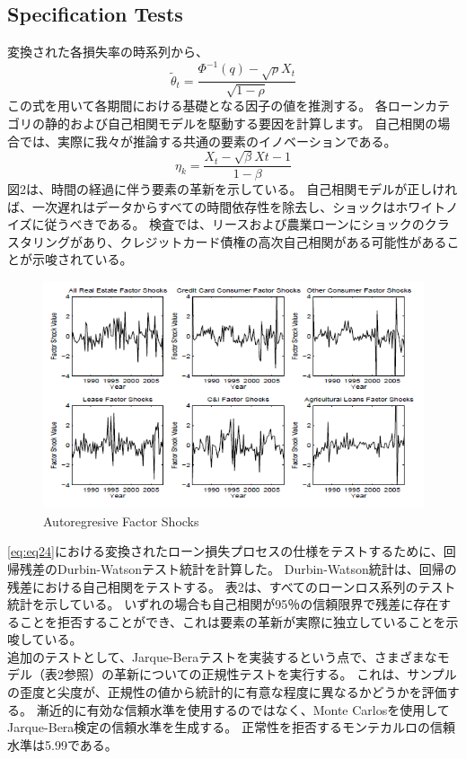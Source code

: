 \documentclass[a4j,12pt]{jarticle}
\begin{document}
\subsection{Specification Tests}
変換された各損失率の時系列から、
\begin{equation}
\tilde{\theta}_t=\frac{\Phi^{-1}(q)-\sqrt{\rho}X_t}{\sqrt{1-\rho}}
\end{equation}
この式を用いて各期間における基礎となる因子の値を推測する。 各ローンカテゴリの静的および自己相関モデルを駆動する要因を計算します。 自己相関の場合では、実際に我々が推論する共通の要素のイノベーションである。
\begin{equation}
\eta_k=\frac{X_t-\sqrt{\beta}X{t-1}}{1-\beta}
\end{equation}
図2は、時間の経過に伴う要素の革新を示している。 自己相関モデルが正しければ、一次遅れはデータからすべての時間依存性を除去し、ショックはホワイトノイズに従うべきである。 検査では、リースおよび農業ローンにショックのクラスタリングがあり、クレジットカード債権の高次自己相関がある可能性があることが示唆されている。
\begin{figure}[H]
\includegraphics{figure/ch2.png}
\caption{Autoregresive Factor Shocks}
\end{figure}
\eqref{eq:eq24}における変換されたローン損失プロセスの仕様をテストするために、回帰残差のDurbin-Watsonテスト統計を計算した。 Durbin-Watson統計は、回帰の残差における自己相関をテストする。 表2は、すべてのローンロス系列のテスト統計を示している。 いずれの場合も自己相関が95％の信頼限界で残差に存在することを拒否することができ、これは要素の革新が実際に独立していることを示唆している。\\
追加のテストとして、Jarque-Beraテストを実装するという点で、さまざまなモデル（表2参照）の革新についての正規性テストを実行する。 これは、サンプルの歪度と尖度が、正規性の値から統計的に有意な程度に異なるかどうかを評価する。 漸近的に有効な信頼水準を使用するのではなく、Monte Carlosを使用してJarque-Bera検定の信頼水準を生成する。 正常性を拒否するモンテカルロの信頼水準は5.99である。\\
\end{document}
